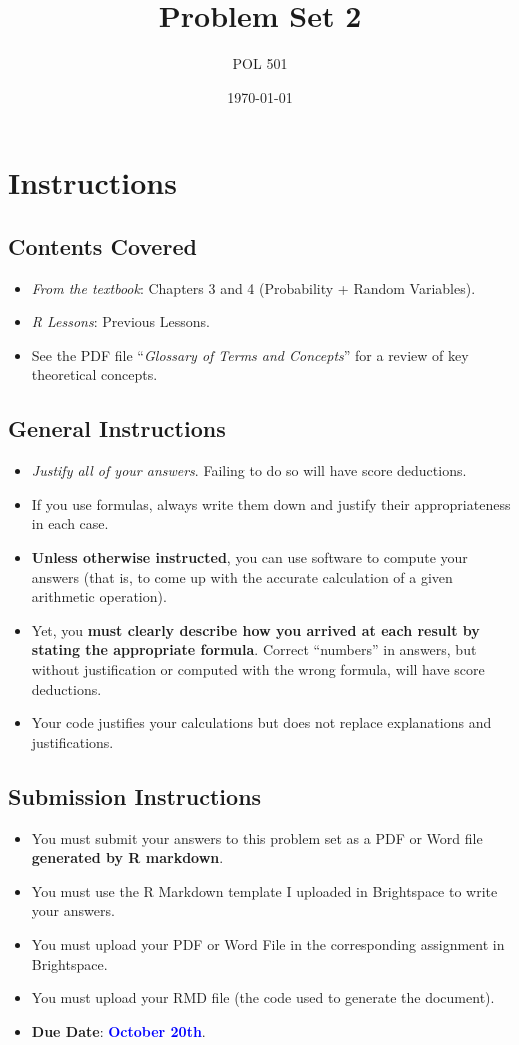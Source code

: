 \documentclass[11pt]{article}
\title{Problem Set 2}
\author{POL 501}
\date{\today}
\begin{document}
\maketitle

\section*{Instructions}
\subsection*{Contents Covered}
\begin{itemize}
    \item \emph{From the textbook}: Chapters 3 and 4 (Probability + Random Variables).
    \item \emph{R Lessons}: Previous Lessons.
    \item See the PDF file ``\emph{Glossary of Terms and Concepts}'' for a review of key theoretical concepts.
\end{itemize}
\subsection*{General Instructions}
\begin{itemize}
    \item \emph{Justify all of your answers}. Failing to do so will have score deductions.
    \item If you use formulas, always write them down and justify their appropriateness in each case.
    \item \textbf{Unless otherwise instructed}, you can use software to compute your answers (that is, to come up with the accurate calculation of a given arithmetic operation).
    \item Yet, you \textbf{must clearly describe how you arrived at each result by stating the appropriate formula}. Correct ``numbers'' in answers, but without justification or computed with the wrong formula, will have score deductions.
    \item Your code justifies your calculations but does not replace explanations and justifications.
\end{itemize}
\subsection*{Submission Instructions}
\begin{itemize}
    \item You must submit your answers to this problem set as a PDF or Word file \textbf{generated by R markdown}.
    \item You must use the R Markdown template I uploaded in Brightspace to write your answers.
    \item You must upload your PDF or Word File in the corresponding assignment in Brightspace.
    \item You must upload your RMD file (the code used to generate the document).
    \item \textbf{Due Date}: \textcolor{blue}{\textbf{October 20th}}.
\end{itemize}
\end{document}
